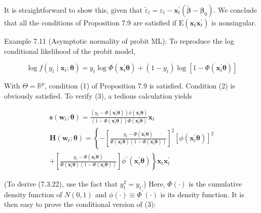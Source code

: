 \documentclass[10pt]{article}
\begin{document}
It is straightforward to show this, given that $\tilde{\varepsilon}_{t}=\varepsilon_{t}-\mathbf{x}_{t}^{\prime}\left(\widetilde{\boldsymbol{\beta}}-\boldsymbol{\beta}_{0}\right)$. We conclude that all the conditions of Proposition 7.9 are satisfied if $\mathrm{E}\left(\mathbf{x}_{t} \mathbf{x}_{t}^{\prime}\right)$ is nonsingular.

Example 7.11 (Asymptotic normality of probit ML): To reproduce the log conditional likelihood of the probit model,


\begin{equation*}
\log f\left(y_{t} \mid \mathbf{x}_{t} ; \boldsymbol{\theta}\right)=y_{t} \log \Phi\left(\mathbf{x}_{t}^{\prime} \boldsymbol{\theta}\right)+\left(1-y_{t}\right) \log \left[1-\Phi\left(\mathbf{x}_{t}^{\prime} \boldsymbol{\theta}\right)\right] \tag{7.3.20}
\end{equation*}


With $\Theta=\mathbb{R}^{p}$, condition (1) of Proposition 7.9 is satisfied. Condition (2) is obviously satisfied. To verify (3), a tedious calculation yields


\begin{gather*}
\mathbf{s}\left(\mathbf{w}_{t} ; \boldsymbol{\theta}\right)=\frac{\left(y_{t}-\Phi\left(\mathbf{x}_{t}^{\prime} \boldsymbol{\theta}\right)\right) \phi\left(\mathbf{x}_{t}^{\prime} \boldsymbol{\theta}\right)}{\left(1-\Phi\left(\mathbf{x}_{t}^{\prime} \boldsymbol{\theta}\right)\right) \Phi\left(\mathbf{x}_{t}^{\prime} \boldsymbol{\theta}\right)} \mathbf{x}_{t}  \tag{7.3.21}\\
\mathbf{H}\left(\mathbf{w}_{t} ; \boldsymbol{\theta}\right)=\left\{-\left[\frac{y_{t}-\Phi\left(\mathbf{x}_{t}^{\prime} \boldsymbol{\theta}\right)}{\Phi\left(\mathbf{x}_{t}^{\prime} \boldsymbol{\theta}\right)\left(1-\Phi\left(\mathbf{x}_{t}^{\prime} \boldsymbol{\theta}\right)\right)}\right]^{2}\left[\phi\left(\mathbf{x}_{t}^{\prime} \boldsymbol{\theta}\right)\right]^{2}\right. \\
\left.+\left[\frac{y_{t}-\Phi\left(\mathbf{x}_{t}^{\prime} \boldsymbol{\theta}\right)}{\Phi\left(\mathbf{x}_{t}^{\prime} \boldsymbol{\theta}\right)\left(1-\Phi\left(\mathbf{x}_{t}^{\prime} \boldsymbol{\theta}\right)\right)}\right] \phi^{\prime}\left(\mathbf{x}_{t}^{\prime} \boldsymbol{\theta}\right)\right\} \mathbf{x}_{t} \mathbf{x}_{t}^{\prime} \tag{7.3.22}
\end{gather*}


(To derive (7.3.22), use the fact that $y_{t}^{2}=y_{t}$.) Here, $\Phi(\cdot)$ is the cumulative\\
density function of $N(0,1)$ and $\phi(\cdot) \equiv \Phi^{\prime}(\cdot)$ is its density function. It is then easy to prove the conditional version of (3):
\end{document}
